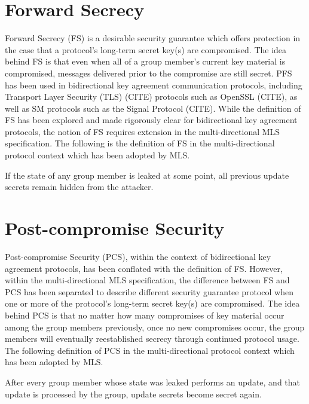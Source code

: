 \hypertarget{forward-secrecy}{%
\section{Forward Secrecy}\label{forward-secrecy}}

Forward Secrecy (FS) is a desirable security guarantee which offers protection in the case that a protocol's long-term secret key(s) are compromised.
The idea behind FS is that even when all of a group member's current key material is compromised, messages delivered prior to the compromise are still secret.
PFS has been used in bidirectional key agreement communication protocols, including Transport Layer Security (TLS) (CITE) protocols such as OpenSSL (CITE), as well as SM protocols such as the Signal Protocol (CITE).
While the definition of FS has been explored and made rigorously clear for bidirectional key agreement protocols, the notion of FS requires extension in the multi-directional MLS specification.
The following is the definition of FS in the multi-directional protocol context \autocite{alwen2020security} which has been adopted by MLS.

\begin{definition}
If the state of any group member is leaked at some point, all previous update secrets remain hidden from the attacker.
\end{definition}

\hypertarget{post-compromise-security}{%
\section{Post-compromise Security}\label{post-compromise-security}}

Post-compromise Security (PCS), within the context of bidirectional key agreement protocols, has been conflated with the definition of FS.
However, within the multi-directional MLS specification, the difference between FS and PCS has been separated to describe different security guarantee protocol when one or more of the protocol's long-term secret key(s) are compromised.
The idea behind PCS is that no matter how many compromises of key material occur among the group members previously, once no new compromises occur, the group members will eventually reestablished secrecy through continued protocol usage.
The following definition of PCS in the multi-directional protocol context \autocite{alwen2020security} which has been adopted by MLS.

\begin{definition}
After every group member whose state was leaked performs an update, and that update is processed by the group, update secrets become secret again.
\end{definition}


